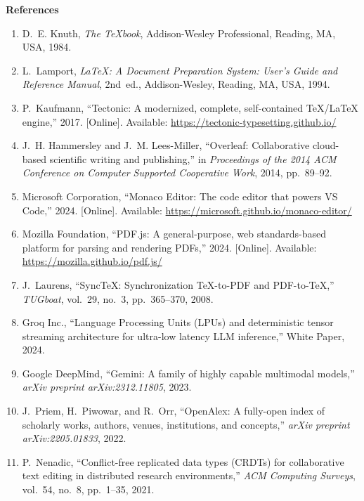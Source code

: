 \documentclass[12pt,a4paper,twoside]{article}
\newcommand{\hone}[1]{%
  \begingroup\setlength{\parskip}{0pt}%
  {\fontsize{18pt}{21.6pt}\selectfont\bfseries #1}\par\nopagebreak
  \vspace{6pt}
  \endgroup}
\begin{document}
\newpage
\hone{References}
\begin{enumerate}[leftmargin=0.5in,labelindent=0pt,labelwidth=0.25in,labelsep=0pt,
                  itemsep=2pt,parsep=0pt,topsep=0pt,partopsep=0pt,align=left]
\item D.~E. Knuth, \emph{The \TeX{}book}, Addison-Wesley Professional, Reading, MA, USA, 1984.
\item L.~Lamport, \emph{\LaTeX{}: A Document Preparation System: User's Guide and Reference Manual}, 2nd~ed., Addison-Wesley, Reading, MA, USA, 1994.
\item P.~Kaufmann, ``Tectonic: A modernized, complete, self-contained \TeX{}/\LaTeX{} engine,'' 2017. [Online]. Available: \url{https://tectonic-typesetting.github.io/}
\item J.~H. Hammersley and J.~M. Lees-Miller, ``Overleaf: Collaborative cloud-based scientific writing and publishing,'' in \emph{Proceedings of the 2014 ACM Conference on Computer Supported Cooperative Work}, 2014, pp.~89--92.
\item Microsoft Corporation, ``Monaco Editor: The code editor that powers VS Code,'' 2024. [Online]. Available: \url{https://microsoft.github.io/monaco-editor/}
\item Mozilla Foundation, ``PDF.js: A general-purpose, web standards-based platform for parsing and rendering PDFs,'' 2024. [Online]. Available: \url{https://mozilla.github.io/pdf.js/}
\item J.~Laurens, ``Sync\TeX{}: Synchronization \TeX{}-to-PDF and PDF-to-\TeX{},'' \emph{TUGboat}, vol.~29, no.~3, pp.~365--370, 2008.
\item Groq Inc., ``Language Processing Units (LPUs) and deterministic tensor streaming architecture for ultra-low latency LLM inference,'' White Paper, 2024.
\item Google DeepMind, ``Gemini: A family of highly capable multimodal models,'' \emph{arXiv preprint arXiv:2312.11805}, 2023.
\item J.~Priem, H.~Piwowar, and R.~Orr, ``OpenAlex: A fully-open index of scholarly works, authors, venues, institutions, and concepts,'' \emph{arXiv preprint arXiv:2205.01833}, 2022.
\item P.~Nenadic, ``Conflict-free replicated data types (CRDTs) for collaborative text editing in distributed research environments,'' \emph{ACM Computing Surveys}, vol.~54, no.~8, pp.~1--35, 2021.

\end{enumerate}
\end{document}

